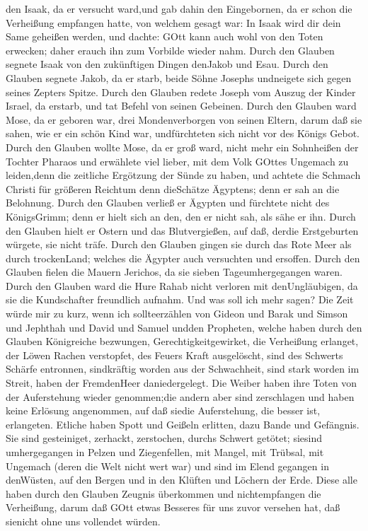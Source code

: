 den Isaak, da er versucht ward,und gab dahin den Eingebornen, da er
schon die Verheißung empfangen hatte,  von welchem gesagt
war: In Isaak wird dir dein Same geheißen werden,  und
dachte: GOtt kann auch wohl von den Toten erwecken; daher erauch ihn zum
Vorbilde wieder nahm.  Durch den Glauben segnete Isaak von
den zukünftigen Dingen denJakob und Esau.  Durch den
Glauben segnete Jakob, da er starb, beide Söhne Josephs undneigete sich
gegen seines Zepters Spitze.  Durch den Glauben redete
Joseph vom Auszug der Kinder Israel, da erstarb, und tat Befehl von
seinen Gebeinen.  Durch den Glauben ward Mose, da er
geboren war, drei Mondenverborgen von seinen Eltern, darum daß sie
sahen, wie er ein schön Kind war, undfürchteten sich nicht vor des
Königs Gebot.  Durch den Glauben wollte Mose, da er groß
ward, nicht mehr ein Sohnheißen der Tochter Pharaos  und
erwählete viel lieber, mit dem Volk GOttes Ungemach zu leiden,denn die
zeitliche Ergötzung der Sünde zu haben,  und achtete die
Schmach Christi für größeren Reichtum denn dieSchätze Ägyptens; denn er
sah an die Belohnung.  Durch den Glauben verließ er Ägypten
und fürchtete nicht des KönigsGrimm; denn er hielt sich an den, den er
nicht sah, als sähe er ihn.  Durch den Glauben hielt er
Ostern und das Blutvergießen, auf daß, derdie Erstgeburten würgete, sie
nicht träfe.  Durch den Glauben gingen sie durch das Rote
Meer als durch trockenLand; welches die Ägypter auch versuchten und
ersoffen.  Durch den Glauben fielen die Mauern Jerichos, da
sie sieben Tageumhergegangen waren.  Durch den Glauben ward
die Hure Rahab nicht verloren mit denUngläubigen, da sie die
Kundschafter freundlich aufnahm.  Und was soll ich mehr
sagen? Die Zeit würde mir zu kurz, wenn ich sollteerzählen von Gideon
und Barak und Simson und Jephthah und David und Samuel undden Propheten,
 welche haben durch den Glauben Königreiche bezwungen,
Gerechtigkeitgewirket, die Verheißung erlanget, der Löwen Rachen
verstopfet,  des Feuers Kraft ausgelöscht, sind des
Schwerts Schärfe entronnen, sindkräftig worden aus der Schwachheit, sind
stark worden im Streit, haben der FremdenHeer daniedergelegt.
 Die Weiber haben ihre Toten von der Auferstehung wieder
genommen;die andern aber sind zerschlagen und haben keine Erlösung
angenommen, auf daß siedie Auferstehung, die besser ist, erlangeten.
 Etliche haben Spott und Geißeln erlitten, dazu Bande und
Gefängnis.  Sie sind gesteiniget, zerhackt, zerstochen,
durchs Schwert getötet; siesind umhergegangen in Pelzen und
Ziegenfellen, mit Mangel, mit Trübsal, mit Ungemach  (deren
die Welt nicht wert war) und sind im Elend gegangen in denWüsten, auf
den Bergen und in den Klüften und Löchern der Erde.  Diese
alle haben durch den Glauben Zeugnis überkommen und nichtempfangen die
Verheißung,  darum daß GOtt etwas Besseres für uns zuvor
versehen hat, daß sienicht ohne uns vollendet würden.


